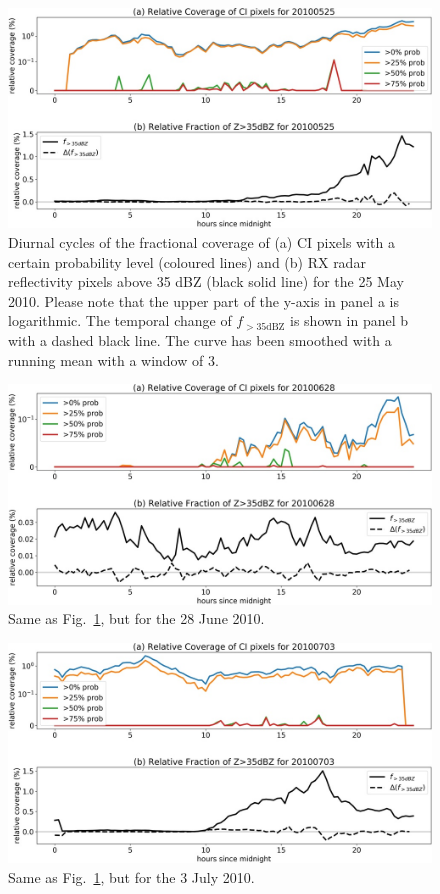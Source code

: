 \begin{figure}
\centering
\includegraphics[width=\textwidth]{Grafiken/Abbildungen/diurnal_cycle_20100525.jpg}
\caption{Diurnal cycles of the fractional coverage of (a) CI pixels with a certain probability level (coloured lines) and (b) RX radar reflectivity pixels above 35 dBZ (black solid line) for the 25 May 2010. Please note that the upper part of the y-axis in panel a is logarithmic. The temporal change of $f_{>35\mathrm{dBZ}}$ is shown in panel b with a dashed black line. The curve has been smoothed with a running mean with a window of 3.}
\label{fig:dc20100523}
\end{figure}
\begin{figure}
\centering
\includegraphics[width=\textwidth]{Grafiken/Abbildungen/diurnal_cycle_20100628.jpg}
\caption{Same as Fig.~\ref{fig:dc20100523}, but for the 28 June 2010.}
\label{fig:dc20100628}
\end{figure}
\begin{figure}
\centering
\includegraphics[width=\textwidth]{Grafiken/Abbildungen/diurnal_cycle_20100703.jpg}
\caption{Same as Fig.~\ref{fig:dc20100523}, but for the 3 July 2010.}
\label{fig:dc20100703}
\end{figure}
